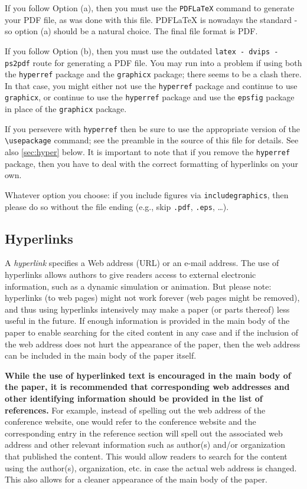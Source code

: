 \documentclass{scspaperproc}
\theoremstyle{scsthe}
\begin{document}
If you follow Option (a), then you must use the \texttt{PDFLaTeX} command to generate your PDF file, as was done with this file. PDFLaTeX is nowadays the standard - so option (a) should be a natural choice. The final file format is PDF.

If you follow Option (b), then you must use the outdated \texttt{latex - dvips - ps2pdf} route for generating a PDF file. You may run into a problem if using both the \texttt{hyperref} package and the \texttt{graphicx} package; there seems to be a clash there.
In that case, you might either not use the \texttt{hyperref} package and continue to use \texttt{graphicx}, or continue to use the \texttt{hyperref} package and use the \texttt{epsfig} package in place of the \texttt{graphicx} package.

If you persevere with \texttt{hyperref} then be sure to use the appropriate version of the \verb+\usepackage+ command; see the preamble in the source of this file for details. See also \autoref{sec:hyper} below. It is important to note that if you remove the \texttt{hyperref} package, then you have to deal with the correct formatting of hyperlinks on your own.

Whatever option you choose: if you include figures via \texttt{includegraphics}, then please do so without the file ending (e.g., skip \texttt{.pdf}, \texttt{.eps}, \ldots).

\subsection{Hyperlinks}
\label{sec:hyper}

A \emph{hyperlink} specifies a Web address (URL) or an e-mail address. The use of hyperlinks allows authors to give readers access to external electronic information, such as a dynamic simulation or animation. 
But please note: hyperlinks (to web pages) might not work forever (web pages might be removed), and thus using hyperlinks intensively may make a paper (or parts thereof) less useful in the future. If enough information is provided in the main body of the paper to enable searching for the cited content in any case and if the inclusion of the web address does not hurt the appearance of the paper, then the web address can be included in the main body of the paper itself.

\textbf{While the use of hyperlinked text is encouraged in the main body of the paper, it is recommended that corresponding web addresses and other identifying information should be provided in the list of references.} For example, instead of spelling out the web address of the conference website, one would refer to the conference website and the corresponding entry in the reference section will spell out the associated web address and other relevant information such as author(s) and/or organization that published the content. This would allow readers to search for the content using the author(s), organization, etc. in case the actual web address is changed. This also allows for a cleaner appearance of the main body of the paper.
\end{document}
